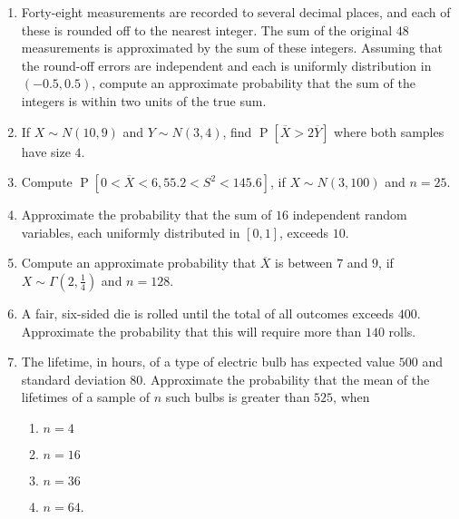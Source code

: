 \documentclass[svgnames]{amsart}
\DeclareMathOperator{\Prob}{P}
\begin{document}
\begin{enumerate}[leftmargin=*, itemsep=2mm]
\item Forty-eight measurements are recorded to several decimal places, and each of these is rounded off to the nearest integer. The sum of the original $48$ measurements is approximated by the sum of these integers. Assuming that the round-off errors are independent and each is uniformly distribution in $(-0.5, 0.5)$, compute an approximate probability that the sum of the integers is within two units of the true sum.

\item If $X \sim N(10, 9)$ and $Y \sim N(3, 4)$, find $\Prob[\overline X > 2 \overline Y]$ where both samples have size $4$.

\item Compute $\Prob[0 < \overline X < 6, 55.2 < S^2 < 145.6]$, if $X \sim N(3, 100)$ and $n = 25$.

\item Approximate the probability that the sum of $16$ independent random variables, each uniformly distributed in $[0, 1]$, exceeds $10$.

\item Compute an approximate probability that $\overline X$ is between $7$ and $9$, if $X \sim \Gamma(2, \frac 1 4)$ and $n = 128$.

\item A fair, six-sided die is rolled until the total of all outcomes exceeds $400$. Approximate the probability that this will require more than $140$ rolls.

\item The lifetime, in hours, of a type of electric bulb has expected value $500$ and standard deviation $80$. Approximate the probability that the mean of the lifetimes of a sample of $n$ such bulbs is greater than $525$, when
\begin{enumerate}[label=(\roman*)]
\item $n = 4$
\item $n = 16$
\item $n = 36$
\item $n = 64$.
\end{enumerate}

\end{enumerate}
\end{document}
